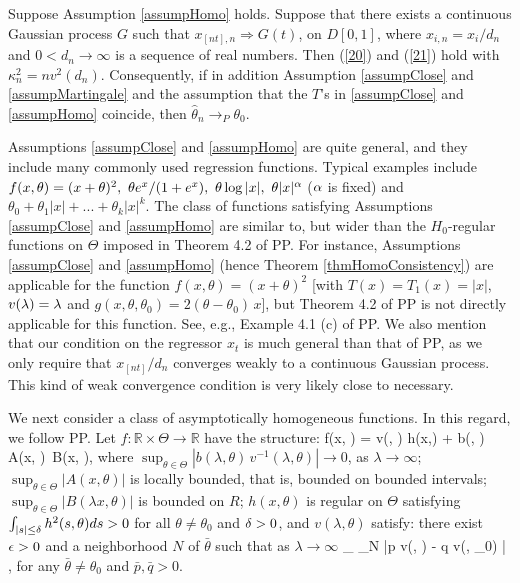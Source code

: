 \begin{thm}  Suppose Assumption \ref{assumpHomo} holds. Suppose that there exists a continuous Gaussian process $G$ such that $x_{[nt], n} \Rightarrow G(t)$, on $D[0,1]$, where $x_{i,n} = x_i / d_n$  and $0 < d_n \to \infty$ is a sequence of real numbers.
Then (\ref {20}) and (\ref {21}) hold with $\kappa^2_n=nv^2(d_n)$. Consequently,
if in addition Assumption \ref{assumpClose} and \ref{assumpMartingale} and the assumption that the $T$'s in \ref{assumpClose} and \ref{assumpHomo} coincide, then $\hat{\theta}_n \rightarrow_P \theta_0$.
\end{thm}


Assumptions \ref{assumpClose} and \ref{assumpHomo} are quite general, and they include many commonly used regression functions. Typical examples include $f(x, \theta)=(x+\theta)^2,\ \theta e^{x}/(1 + e^x),\ \theta \log |x|,\ \theta |x|^\alpha$ ($\alpha$ is fixed) and $\theta_0+\theta_1 |x|+...+\theta_k|x|^k$.
The class of functions satisfying Assumptions \ref{assumpClose} and \ref{assumpHomo} are similar to, but wider than the  $H_0$-regular functions on $\Theta$ imposed in Theorem 4.2 of PP. For instance,   Assumptions \ref{assumpClose} and \ref{assumpHomo} (hence Theorem \ref{thmHomoConsistency}) are applicable for   the function $f(x, \theta)=(x+\theta)^2$  [with $T(x)= T_1(x)=|x|$, $v(\lambda)=\lambda$ and $g(x, \theta, \theta_0)=2(\theta-\theta_0)\, x$], but Theorem 4.2 of PP is not  directly applicable for this function. See, e.g., Example 4.1 (c) of PP. We also mention that our condition on the regressor $x_t$ is much general than that of PP, as we only require that $x_{[nt]} / d_n$ converges weakly to a continuous Gaussian  process. This kind of weak convergence condition is very likely close to necessary.

\medskip
We next consider  a class of asymptotically homogeneous functions. In this regard, we follow PP. Let $f:\mathbb{R} \times \Theta \rightarrow \mathbb{R} $ have the structure:
 \be
 f(\lambda x, \theta) = v(\lambda, \theta) h(x,\theta) + b(\lambda, \theta)\, A(x, \theta)\, B(\lambda x, \theta), 
 \ee
 where $\sup_{\theta\in \Theta}|b(\lambda, \theta)\, v^{-1}(\lambda, \theta)|\to 0$, as $\lambda\to \infty$; $\sup_{\theta\in \Theta}|A(x, \theta)|$ is locally bounded, that is, bounded on bounded intervals;
 $\sup_{\theta\in \Theta} |B(\lambda x, \theta)|$ is bounded on $R$; $h(x, \theta)$ is regular on $\Theta$ satisfying $\int_{|s| \le \delta} h^2(s, \theta)  ds > 0$   for all $\theta \ne \theta_0$ and $\delta > 0$,  and $v(\lambda, \theta)$ satisfy:   there exist $\epsilon > 0$ and a neighborhood $N$ of $\bar{\theta}$ such that as $\lambda \to \infty$
\be
\inf_{} \inf_{\theta \in N} |p v(\lambda, \theta) - q v(\lambda, \theta_0) | \to \infty,
\ee
for any $\bar{\theta} \ne \theta_0$ and $\bar{p}, \bar{q} > 0$.


